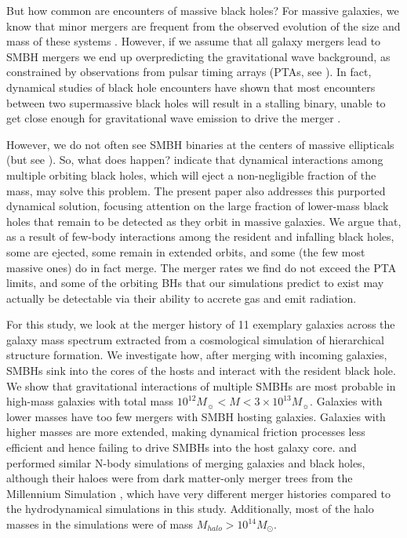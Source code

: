 \documentclass[fleqn,usenatbib,useAMS]{mnras}
\begin{document}
But how common are encounters of massive black holes?  For massive galaxies, we know that minor mergers are frequent from the observed evolution of the size and mass of these systems \citep{2010ApJ...718L..73V, 2008ApJ...677L...5V, 2019MNRAS.484..595M}. However, if we assume that all galaxy mergers lead to SMBH mergers we end up overpredicting the  gravitational wave background, as constrained by observations from pulsar timing arrays (PTAs, see \citealt{2008MNRAS.390..192S, 2009MNRAS.394.2255S, 2013MNRAS.433L...1S, 2014ApJ...789..156M, 2015ApJ...799..178K, 2016APS..APRR18003T, 2018ApJ...856...42S, 2018MNRAS.479.4017I, 2018ApJ...863L..36I, 2018NatCo...9..573M}). In fact, dynamical studies of black hole encounters have shown that most encounters between two supermassive black holes will result in a stalling binary, unable to get close enough for gravitational wave emission to drive the merger \citep{1980Natur.287..307B, 2003AIPC..686..201M}.

However, we do not often see SMBH binaries at the centers of massive ellipticals (but see \citealt{2016MNRAS.463.2145C}).  So, what does happen?  \cite{2018MNRAS.473.3410R} indicate that dynamical interactions among multiple orbiting black holes, which will eject a non-negligible fraction of the mass, may solve this problem.  The present paper also addresses this purported dynamical solution, focusing attention on the large fraction of lower-mass black holes that remain to be detected as they orbit in massive galaxies.  We argue that, as a result of few-body interactions among the resident and infalling black holes, some are ejected, some remain in extended orbits, and some (the few most massive ones) do in fact merge. The merger rates we find do not exceed the PTA limits, and some of the orbiting BHs that our simulations predict to exist may actually be detectable via their ability to accrete gas and emit radiation.

For this study, we look at the merger history of 11 exemplary galaxies across the galaxy mass spectrum extracted from a cosmological simulation of hierarchical structure formation. We investigate how, after merging with incoming galaxies, SMBHs sink into the cores of the hosts and interact with the resident black hole. We show that gravitational interactions of multiple SMBHs are most probable in high-mass galaxies with total mass $10^{12} M_{\sun} < M < 3\times10^{13} M_{\sun}$. Galaxies with lower masses have too few mergers with SMBH hosting galaxies. Galaxies with higher masses are more extended, making dynamical friction processes less efficient and hence failing to drive SMBHs into the host galaxy core.  \cite{2012MNRAS.422.1306K} and \cite{2018MNRAS.473.3410R} performed similar N-body simulations of merging galaxies and black holes, although their haloes were from dark matter-only merger trees from the Millennium Simulation \citep{2005Natur.435..629S}, which have very different merger histories compared to the hydrodynamical simulations in this study.  Additionally, most of the halo masses in the \cite{2012MNRAS.422.1306K} simulations were of mass $M_{halo} > 10^{14} M_{\odot}$.
\end{document}
